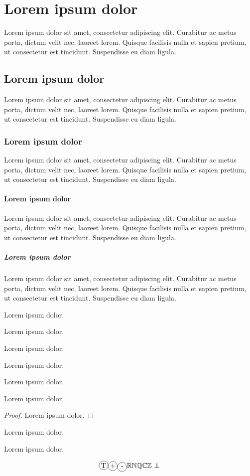 \newcommand{\lorem}{Lorem ipsum dolor sit amet, consectetur adipiscing elit. Curabitur ac metus porta, dictum velit nec, laoreet lorem. Quisque facilisis nulla et sapien pretium, ut consectetur est tincidunt. Suspendisse eu diam ligula.}

\section{Lorem ipsum dolor}
\lorem

\subsection{Lorem ipsum dolor}
\lorem
\subsubsection{Lorem ipsum dolor}
\lorem
\paragraph{Lorem ipsum dolor}
\lorem
\subparagraph{Lorem ipsum dolor}
\lorem

\begin{definition}
    Lorem ipsum dolor.
\end{definition}

\begin{property}
    Lorem ipsum dolor.
\end{property}

\begin{proposition}
    Lorem ipsum dolor.
\end{proposition}

\begin{theorem}
    Lorem ipsum dolor.
\end{theorem}

\begin{corollary}
    Lorem ipsum dolor.
\end{corollary}

\begin{lemma}
    Lorem ipsum dolor.
\end{lemma}

\begin{proof}
    Lorem ipsum dolor.
\end{proof}

\begin{example}
    Lorem ipsum dolor.
\end{example}

\begin{remark}
    Lorem ipsum dolor.
\end{remark}

$$\circled{T} \cplus \cminus \R \N \Q \C \Z \independant$$
